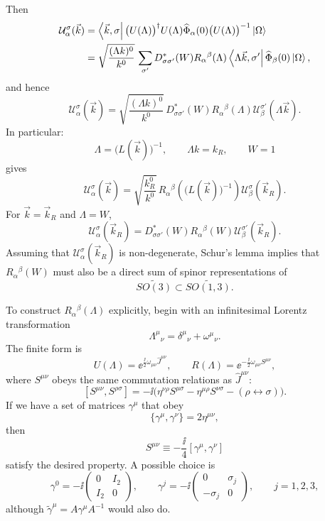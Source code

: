 Then
\[
\begin{aligned}
\mathcal U_\alpha^\sigma(\vec k)
&=
\bra{\vec k,\sigma}
\bigl(U(\Lambda)\bigr)^\dagger U(\Lambda)
\widehat\Phi_\alpha(0)
\bigl(U(\Lambda)\bigr)^{-1}
\ket\Omega
\\
&=
\sqrt{\frac{(\Lambda k)^0}{k^0}}\,
\sum_{\sigma'}
D_{\sigma\sigma'}^*(W)
R_\alpha{}^\beta(\Lambda)
\bra{\Lambda\vec k,\sigma'}
\widehat\Phi_\beta(0)\ket\Omega,
\end{aligned}
\]
and hence
\[
  \mathcal U_\alpha^\sigma(\vec k)
  =
  \sqrt{\frac{(\Lambda k)^0}{k^0}}\,
  D_{\sigma\sigma'}^*(W)
  R_\alpha{}^\beta(\Lambda)
  \mathcal U_\beta^{\sigma'}(\Lambda\vec k).
\]
In particular:
\[
  \Lambda=\bigl(L(\vec k)\bigr)^{-1},
  \qquad
  \Lambda k=k_R,
  \qquad
  W=1
\]
gives
\[
  \mathcal U_\alpha^\sigma(\vec k)
  =
  \sqrt{\frac{k_R^0}{k^0}}\,
  R_\alpha{}^\beta\!\left(\bigl(L(\vec k)\bigr)^{-1}\right)
  \mathcal U_\beta^\sigma(\vec k_R).
\]
For \(\vec k=\vec k_R\) and \(\Lambda=W\),
\[
  \mathcal U_\alpha^\sigma(\vec k_R)
  =
  D_{\sigma\sigma'}^*(W)R_\alpha{}^\beta(W)
  \mathcal U_\beta^{\sigma'}(\vec k_R).
\]
Assuming that \(\mathcal U_\alpha^\sigma(\vec k_R)\) is non-degenerate,
Schur's lemma implies that \(R_\alpha{}^\beta(W)\) must also be a direct sum
of spinor representations of
\[
  \widetilde{SO(3)}\subset \widetilde{SO(1,3)}.
\]

To construct \(R_\alpha{}^\beta(\Lambda)\) explicitly, begin with an
infinitesimal Lorentz transformation
\[
  \Lambda^\mu{}_\nu=\delta^\mu{}_\nu+\omega^\mu{}_\nu.
\]
The finite form is
\[
  U(\Lambda)=\ee^{\frac{\ii}{2}\omega_{\mu\nu}\widehat J^{\mu\nu}},
  \qquad
  R(\Lambda)=\ee^{-\frac{\ii}{2}\omega_{\mu\nu}S^{\mu\nu}},
\]
where \(S^{\mu\nu}\) obeys the same commutation relations as
\(\widehat J^{\mu\nu}\):
\[
  [S^{\mu\nu},S^{\rho\sigma}]
  =
  -\ii\bigl(
    \eta^{\nu\rho}S^{\mu\sigma}
    -\eta^{\mu\rho}S^{\nu\sigma}
    -(\rho\leftrightarrow\sigma)
  \bigr).
\]
If we have a set of matrices \(\gamma^\mu\) that obey
\[
  \{\gamma^\mu,\gamma^\nu\}=2\eta^{\mu\nu},
\]
then
\[
  S^{\mu\nu}\equiv -\frac{\ii}{4}[\gamma^\mu,\gamma^\nu]
\]
satisfy the desired property.  A possible choice is
\[
  \gamma^0=-\ii
  \begin{pmatrix}
  0&I_2\\ I_2&0
  \end{pmatrix},
  \qquad
  \gamma^j=-\ii
  \begin{pmatrix}
  0&\sigma_j\\ -\sigma_j&0
  \end{pmatrix},
  \qquad j=1,2,3,
\]
although \(\widetilde\gamma^\mu=A\gamma^\mu A^{-1}\) would also do.

